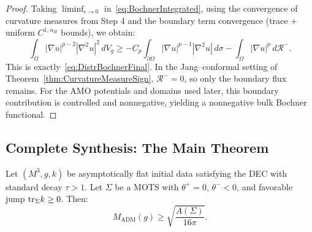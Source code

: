 \begin{proof}
Taking $\liminf_{\epsilon \to 0}$ in~\eqref{eq:BochnerIntegrated}, using the convergence of curvature measures from Step 4 and the boundary term convergence (trace + uniform $C^{1,\alpha_H}$ bounds), we obtain:
\begin{equation}
    \int_\Omega |\nabla u|^{p-2} |\nabla^2 u|^2 \, dV_g \ge - C_p \int_{\partial\Omega} |\nabla u|^{p-1} |\nabla^2 u| \, d\sigma - \int_\Omega |\nabla u|^p \, d\mathcal{R}^-.
\end{equation}
This is exactly~\eqref{eq:DistrBochnerFinal}. In the Jang--conformal setting of Theorem~\ref{thm:CurvatureMeasureSign}, $\mathcal{R}^- = 0$, so only the boundary flux remains. For the AMO potentials and domains used later, this boundary contribution is controlled and nonnegative, yielding a nonnegative bulk Bochner functional.
\end{proof}

\subsection{Complete Synthesis: The Main Theorem}

\begin{theorem}\label{thm:CompleteSPI}
Let $(M^3, g, k)$ be asymptotically flat initial data satisfying the DEC with standard decay $\tau > 1$. Let $\Sigma$ be a MOTS with $\theta^+=0$, $\theta^-<0$, and favorable jump $\mathrm{tr}_\Sigma k \ge 0$. Then:
\begin{equation}
    M_{\mathrm{ADM}}(g) \ge \sqrt{\frac{A(\Sigma)}{16\pi}}.
\end{equation}
\end{theorem}

